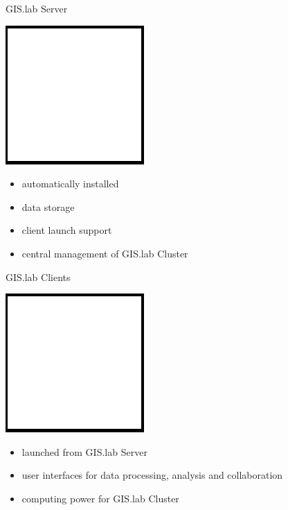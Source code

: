 \documentclass[12pt]{beamer}
\begin{document}
\begin{frame}{GIS.lab Server}
	\begin{center}
		\includegraphics[keepaspectratio=true,height=0.5\textheight]{images/image.png}
	\end{center}
	\begin{itemize}
		\item automatically installed
		\item data storage
		\item client launch support
		\item central management of GIS.lab Cluster
	\end{itemize}
\end{frame}

\begin{frame}{GIS.lab Clients}
	\begin{center}
		\includegraphics[keepaspectratio=true,height=0.5\textheight]{images/image.png}
	\end{center}
	\begin{itemize}
		\item launched from GIS.lab Server 
		\item user interfaces for data processing, analysis and collaboration
		\item computing power for GIS.lab Cluster
	\end{itemize}
\end{frame}
\end{document}
